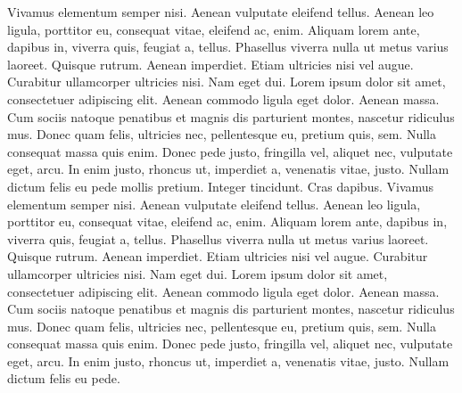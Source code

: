 \documentclass[
    12pt,
    letterpaper,
    oneside,
    noraggedright
]{turabian-researchpaper}
\begin{document}
Vivamus elementum semper nisi. Aenean vulputate eleifend tellus. Aenean
leo ligula, porttitor eu, consequat vitae, eleifend ac, enim. Aliquam
lorem ante, dapibus in, viverra quis, feugiat a, tellus. Phasellus
viverra nulla ut metus varius laoreet. Quisque rutrum. Aenean imperdiet.
Etiam ultricies nisi vel augue. Curabitur ullamcorper ultricies nisi.
Nam eget dui. Lorem ipsum dolor sit amet, consectetuer adipiscing elit.
Aenean commodo ligula eget dolor. Aenean massa. Cum sociis natoque
penatibus et magnis dis parturient montes, nascetur ridiculus mus. Donec
quam felis, ultricies nec, pellentesque eu, pretium quis, sem. Nulla
consequat massa quis enim. Donec pede justo, fringilla vel, aliquet nec,
vulputate eget, arcu. In enim justo, rhoncus ut, imperdiet a, venenatis
vitae, justo. Nullam dictum felis eu pede mollis pretium. Integer
tincidunt. Cras dapibus. Vivamus elementum semper nisi. Aenean vulputate
eleifend tellus. Aenean leo ligula, porttitor eu, consequat vitae,
eleifend ac, enim. Aliquam lorem ante, dapibus in, viverra quis, feugiat
a, tellus. Phasellus viverra nulla ut metus varius laoreet. Quisque
rutrum. Aenean imperdiet. Etiam ultricies nisi vel augue. Curabitur
ullamcorper ultricies nisi. Nam eget dui. Lorem ipsum dolor sit amet,
consectetuer adipiscing elit. Aenean commodo ligula eget dolor. Aenean
massa. Cum sociis natoque penatibus et magnis dis parturient montes,
nascetur ridiculus mus. Donec quam felis, ultricies nec, pellentesque
eu, pretium quis, sem. Nulla consequat massa quis enim. Donec pede
justo, fringilla vel, aliquet nec, vulputate eget, arcu. In enim justo,
rhoncus ut, imperdiet a, venenatis vitae, justo. Nullam dictum felis eu
pede.
\end{document}
